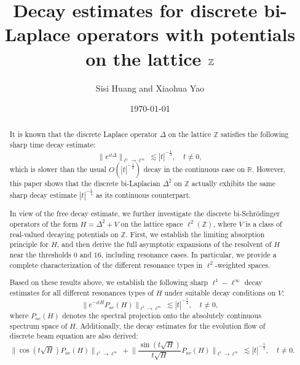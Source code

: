 \documentclass[reqno, 11pt]{amsart}
\title[Decay estimates for discrete bi-Laplace operators with potentials]{Decay estimates for discrete bi-Laplace operators with potentials on the lattice $\Z$ }
\author{ Sisi Huang and Xiaohua Yao }
\date{\today}
\newcommand\Z{\mathbb{Z}}
\numberwithin{equation}{section}
\begin{document}
\maketitle

\begin{abstract}

It is known that the discrete Laplace operator $\Delta$ on the lattice $\mathbb{Z}$ satisfies the following sharp time decay estimate:
$$\big\|e^{it\Delta}\big\|_{\ell^1\rightarrow\ell^{\infty}}\lesssim|t|^{-\frac{1}{3}},\quad t\neq0,$$
which is slower than the usual $ O(|t|^{-\frac{1}{2}})$ decay in the continuous case on $\mathbb{R}$. However, this paper shows that the discrete bi-Laplacian $\Delta^2$ on $\mathbb{Z}$ actually exhibits the same sharp decay estimate $|t|^{-\frac{1}{4}}$ as its continuous counterpart.

In view of the free decay estimate, we further investigate the discrete bi-Schr\"{o}dinger operators of the form $H=\Delta^2+V$ on the lattice space $\ell^2(\mathbb{Z})$, where $V$ is a class of real-valued decaying potentials on $\Z$. %
First, we establish the limiting absorption principle for $H$, and then derive the full asymptotic expansions of the resolvent of $H$ near the thresholds $0$ and $16$, including resonance cases. In particular, we provide a complete characterization of the different resonance types in $\ell^2$-weighted spaces. 

Based on these results above, we establish the following sharp $\ell^1-\ell^{\infty}$ decay estimates for all different resonances types of $H$ under suitable decay conditions on $V$:
$$\big\|e^{-itH}P_{ac}(H)\big\|_{\ell^1\rightarrow\ell^{\infty}}\lesssim|t|^{-\frac{1}{4}},\quad t\neq0,$$
where $P_{ac}(H)$ denotes the spectral projection onto the absolutely continuous spectrum space of $H$. 
Additionally, the  decay estimates for the evolution flow of discrete beam equation are also derived:
$$\|{\cos}(t\sqrt H)P_{ac}(H)\|_{\ell^1\rightarrow\ell^{\infty}}+\Big\|\frac{{\sin}(t\sqrt H)}{t\sqrt H}P_{ac}(H)\Big\|_{\ell^1\rightarrow\ell^{\infty}}\lesssim|t|^{-\frac{1}{3}},\quad t\neq0.$$
\end{abstract}
\end{document}

